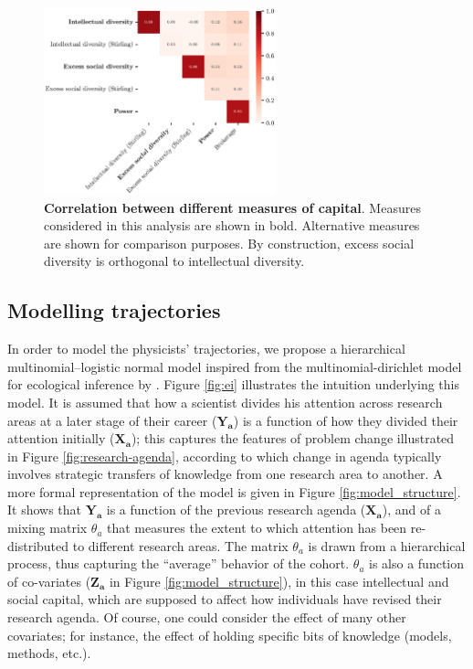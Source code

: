 \documentclass{article}
\begin{document}
\begin{figure}
    \centering
    \includegraphics[width=0.6\textwidth]{plots/capital_measures.eps}
    \caption{\textbf{Correlation between different measures of capital}. Measures considered in this analysis are shown in bold. Alternative measures are shown for comparison purposes. By construction, excess social diversity is orthogonal to intellectual diversity. }
    \label{fig:capital_measures}
\end{figure}

\subsection{\label{sec:model}Modelling trajectories}

In order to model the physicists' trajectories, we propose a hierarchical multinomial--logistic normal model inspired from the multinomial-dirichlet model for ecological inference by \citet{RosJiaKin01}. Figure \ref{fig:ei} illustrates the intuition underlying this model. It is assumed that how a scientist divides his attention across research areas at a later stage of their career ($\bm{Y_{a}}$) is a function of how they divided their attention initially ($\bm{X_{a}}$); this captures the features of problem change illustrated in Figure \ref{fig:research-agenda}, according to which change in agenda typically involves strategic transfers of knowledge from one research area to another. A more formal representation of the model is given in Figure \ref{fig:model_structure}. It shows that $\bm{Y_{a}}$ is a function of the previous research agenda ($\bm{X_{a}}$), and of a mixing matrix $\theta_a$ that measures the extent to which attention has been re-distributed to different research areas. The matrix $\theta_a$ is drawn from a hierarchical process, thus capturing the ``average'' behavior of the cohort. $\theta_a$ is also a function of co-variates ($\bm{Z_a}$ in Figure \ref{fig:model_structure}), in this case intellectual and social capital, which are supposed to affect how individuals have revised their research agenda. Of course, one could consider the effect of many other covariates; for instance, the effect of holding specific bits of knowledge (models, methods, etc.).
\end{document}
